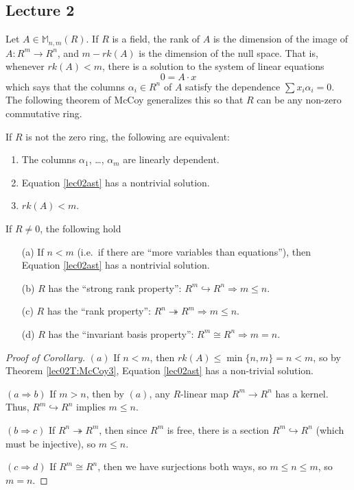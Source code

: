  \subsection{Lecture 2}

 Let $A\in \mathbb{M}_{n,m}(R)$. If $R$ is a field, the rank of $A$ is the dimension of the
 image of $A:R^m\to R^n$, and $m-rk(A)$ is the dimension of the null space. That
 is, whenever $rk(A)< m$, there is a solution to the system of linear equations
 \begin{equation}
 0 = A\cdot x \label{lec02ast}
 \end{equation}
 which says that the columns $\alpha_i\in R^n$ of $A$ satisfy the dependence $\sum
 x_i\alpha_i=0$. The following theorem of McCoy generalizes this so that $R$ can be any
 non-zero commutative ring.
 \begin{theorem}[McCoy]\label{lec02T:McCoy3}
   If $R$ is not the zero ring, the following are equivalent:
   \begin{enumerate}
     \item The columns $\alpha_1$, \dots, $\alpha_m$ are linearly dependent.
     \item Equation \ref{lec02ast} has a nontrivial solution.
     \item $rk(A)<m$.
   \end{enumerate}
 \end{theorem}
 \begin{corollary}
   If $R\ne 0$, the following hold
   \begin{enumerate}
     \item[(a)] If $n<m$ (i.e.\ if there are ``more variables than equations''), then
      Equation \ref{lec02ast} has a nontrivial solution.
     \item[(b)] $R$ has the ``strong rank property'':
        $R^m\hookrightarrow R^n \Longrightarrow m\le n$.
     \item[(c)] $R$ has the ``rank property'':
        $R^n\twoheadrightarrow R^m \Longrightarrow m\le n$.
     \item[(d)] $R$ has the ``invariant basis property'':
        $R^m\cong R^n \Longrightarrow m=n$.
   \end{enumerate}
 \end{corollary}
 \begin{proof}[Proof of Corollary]
   $(a)$ If $n<m$, then $rk(A)\le \min\{n,m\} =n< m$, so by Theorem \ref{lec02T:McCoy3},
   Equation \ref{lec02ast} has a non-trivial solution.

   $(a\Rightarrow b)$ If $m>n$, then by $(a)$, any $R$-linear map $R^m\to R^n$
   has a kernel. Thus, $R^m\hookrightarrow R^n$ implies $m\le n$.

   $(b\Rightarrow c)$ If $R^n\twoheadrightarrow R^m$, then since $R^m$ is free,
   there is a section $R^m\hookrightarrow R^n$ (which must be injective), so $m\le n$.

   $(c\Rightarrow d)$ If $R^m\cong R^n$, then we have surjections both ways, so
   $m\le n\le m$, so $m=n$.
 \end{proof}
